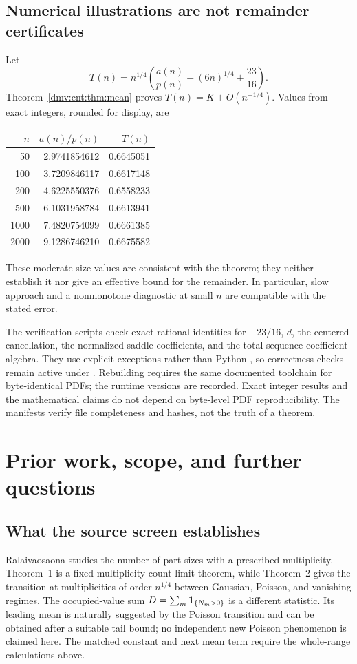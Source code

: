 \documentclass[11pt,letterpaper]{article}
\numberwithin{equation}{section}
\theoremstyle{definition}\newtheorem{definition}[theorem]{Definition}
\theoremstyle{remark}\newtheorem{remark}[theorem]{Remark}
\newcommand{\code}[1]{\texttt{\detokenize{#1}}}
\begin{document}
\subsection{Numerical illustrations are not remainder certificates}
Let
\[
T(n)=n^{1/4}\left(\frac{a(n)}{p(n)}-(6n)^{1/4}+\frac{23}{16}\right).
\]
Theorem~\ref{dmv:cnt:thm:mean} proves $T(n)=K+O(n^{-1/4})$. Values from exact integers, rounded for display, are
\begin{center}
\begin{tabular}{@{}rrr@{}}\toprule
$n$ & $a(n)/p(n)$ & $T(n)$\\\midrule
50 & 2.9741854612 & 0.6645051\\
100 & 3.7209846117 & 0.6617148\\
200 & 4.6225550376 & 0.6558233\\
500 & 6.1031958784 & 0.6613941\\
1000 & 7.4820754099 & 0.6661385\\
2000 & 9.1286746210 & 0.6675582\\\bottomrule
\end{tabular}
\end{center}
These moderate-size values are consistent with the theorem; they neither establish it nor give an effective bound for the remainder. In particular, slow approach and a nonmonotone diagnostic at small $n$ are compatible with the stated error.

The verification scripts check exact rational identities for $-23/16$, $d$, the centered cancellation, the normalized saddle coefficients, and the total-sequence coefficient algebra. They use explicit exceptions rather than Python \code{assert}, so correctness checks remain active under \code{python3 -O}. Rebuilding requires the same documented toolchain for byte-identical PDFs; the runtime versions are recorded. Exact integer results and the mathematical claims do not depend on byte-level PDF reproducibility. The manifests verify file completeness and hashes, not the truth of a theorem.

\section{Prior work, scope, and further questions}\label{dmv:cnt:sec:sources}
\subsection{What the source screen establishes}
Ralaivaosaona \cite{ralaivaosaona} studies the number of part sizes with a prescribed multiplicity. Theorem~1 is a fixed-multiplicity count limit theorem, while Theorem~2 gives the transition at multiplicities of order $n^{1/4}$ between Gaussian, Poisson, and vanishing regimes. The occupied-value sum $D=\sum_m{\bf1}_{\{N_m>0\}}$ is a different statistic. Its leading mean is naturally suggested by the Poisson transition and can be obtained after a suitable tail bound; no independent new Poisson phenomenon is claimed here. The matched constant and next mean term require the whole-range calculations above.
\end{document}
